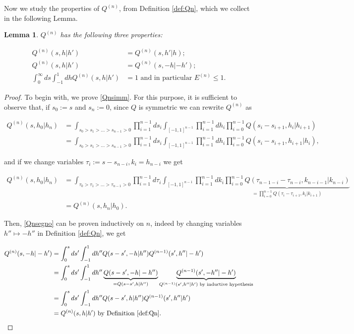 \documentclass[a4paper,10pt,reqno]{amsart}
\newtheorem{lemma}{Lemma}[section]
\numberwithin{equation}{subsection}
\numberwithin{figure}{subsection}
\begin{document}
Now we study the properties of $Q^{(n)}$, from Definition \ref{def:Qn}, which we collect in the following Lemma.
\begin{lemma}\label{proprQn} $Q^{(n)}$ has the following three properties:

\begin{align}
\label{Qnsimm}Q^{(n)}(s,h|h')&=Q^{(n)}(s,h'|h);
\\
\label{Qnsegno}Q^{(n)}(s,h|h')&=Q^{(n)}(s,-h|-h');
\\
\label{Qnint1}\int_0^{\infty}ds\int_{-1}^1dhQ^{(n)}(s,h|h')&=1\textrm{ and in particular }E^{(n)}\leq1.
\end{align}

\end{lemma}
\begin{proof}
To begin with, we prove \eqref{Qnsimm}. For this purpose, it is sufficient to observe that, if $s_0:=s$ and $s_n:=0$, since $Q$ is symmetric we can rewrite $Q^{(n)}$ as

\begin{align*}
Q^{(n)}(s,h_0|h_n)&=\int_{s_0>s_1>\dots>s_{n-1}>0}\prod_{i=1}^{n-1}ds_i\int_{[-1,1]^{n-1}}\prod_{i=1}^{n-1}dh_i\prod_{i=0}^{n-1}Q(s_i-s_{i+1},h_i|h_{i+1})
\\
&=\int_{s_0>s_1>\dots>s_{n-1}>0}\prod_{i=1}^{n-1}ds_i\int_{[-1,1]^{n-1}}\prod_{i=1}^{n-1}dh_i\prod_{i=0}^{n-1}Q(s_i-s_{i+1},h_{i+1}|h_i),
\end{align*}

and if we change variables $\tau_i:=s-s_{n-i},k_i=h_{n-i}$ we get

{\scriptsize\begin{align*}
Q^{(n)}(s,h_0|h_n)&=\int_{\tau_0>\tau_1>\dots>\tau_{n-1}>0}\prod_{i=1}^{n-1}d\tau_i\int_{[-1,1]^{n-1}}\prod_{i=1}^{n-1}dk_i\underbrace{\prod_{i=0}^{n-1}Q(\tau_{n-1-i}-\tau_{n-i},k_{n-i-1}|k_{n-i})}_{=\prod_{i=0}^{n-1}Q(\tau_i-\tau_{i+1},k_i|k_{i+1})}
\\
&=Q^{(n)}(s,h_n|h_0).
\end{align*}}

Then, \eqref{Qnsegno} can be proven inductively on $n$, indeed by changing variables $h''\mapsto-h''$ in Definition \ref{def:Qn}, we get

{\small\begin{align*}
Q^{(n)}(s,-h|-h')&=\int_0^sds'\int_{-1}^1dh''Q(s-s',-h|h'')Q^{(n-1)}(s',h''|-h')
\\
&=\int_0^sds'\int_{-1}^1dh''\underbrace{Q(s-s',-h|-h'')}_{=Q(s-s',h|h'')}\underbrace{Q^{(n-1)}(s',-h''|-h')}_{Q^{(n-1)}(s',h''|h') \textrm{ by inductive hypothesis}}
\\
&=\int_0^sds'\int_{-1}^1dh''Q(s-s',h|h'')Q^{(n-1)}(s',h''|h')
\\
&=Q^{(n)}(s,h|h')\textrm{ by Definition }\ref{def:Qn}.
\end{align*}}


\end{proof}
\end{document}
